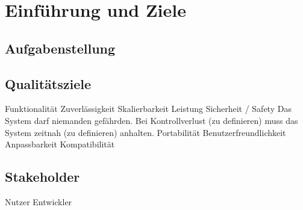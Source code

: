 \chapter{Einführung und Ziele}

\section{Aufgabenstellung}



\section{Qualitätsziele}

Funktionalität
Zuverlässigkeit 
Skalierbarkeit
Leistung 
Sicherheit / Safety
Das System darf niemanden gefährden. Bei Kontrollverlust (zu definieren) muss das System zeitnah (zu definieren) anhalten.
Portabilität
Benutzerfreundlichkeit 
Anpassbarkeit
Kompatibilität

\section{Stakeholder}

Nutzer
Entwickler